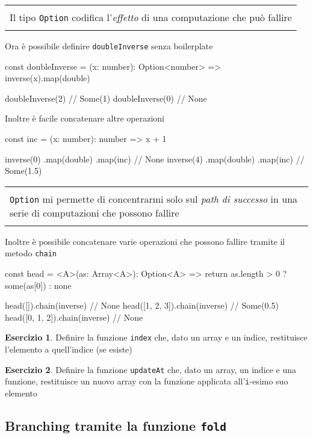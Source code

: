 \documentclass[12pt]{article}
\theoremstyle{definition}
\newtheorem{exercise}{Esercizio}[subsection]
\newenvironment{boxed}
    {\begin{center}
    \begin{tabular}{|p{0.9\textwidth}|}
    \hline\\
    }
    {
    \\\\\hline
    \end{tabular}
    \end{center}
    }
\newenvironment{code}
  {\vspace{0.5cm} \VerbatimEnvironment\begin{typescriptcode}}
  {\end{typescriptcode} \vspace{0.2cm}}
\begin{document}
\begin{boxed}
Il tipo \texttt{Option} codifica l'\emph{effetto} di una computazione che può fallire
\end{boxed}

Ora è possibile definire \texttt{doubleInverse} senza boilerplate

\begin{code}
const doubleInverse = (x: number): Option<number> =>
  inverse(x).map(double)

doubleInverse(2) // Some(1)
doubleInverse(0) // None
\end{code}

Inoltre è facile concatenare altre operazioni

\begin{code}
const inc = (x: number): number => x + 1

inverse(0)
  .map(double)
  .map(inc) // None
inverse(4)
  .map(double)
  .map(inc) // Some(1.5)
\end{code}

\begin{boxed}
\texttt{Option} mi permette di concentrarmi solo sul \emph{path di successo} in una serie di computazioni che possono fallire
\end{boxed}

Inoltre è possibile concatenare varie operazioni che possono fallire tramite il metodo \texttt{chain}

\begin{code}
const head = <A>(as: Array<A>): Option<A> => {
  return as.length > 0 ? some(as[0]) : none
}

head([]).chain(inverse) // None
head([1, 2, 3]).chain(inverse) // Some(0.5)
head([0, 1, 2]).chain(inverse) // None
\end{code}

\begin{exercise}
Definire la funzione \texttt{index} che, dato un array e un indice, restituisce l'elemento a quell'indice (se esiste)
\end{exercise}

\begin{exercise}
Definire la funzione \texttt{updateAt} che, dato un array, un indice e una funzione, restituisce un nuovo array
con la funzione applicata all'\texttt{i}-esimo suo elemento
\end{exercise}

\subsection{Branching tramite la funzione \texttt{fold}}
\end{document}
